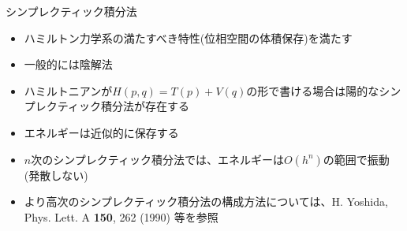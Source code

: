 \begin{frame}[t,fragile]{シンプレクティック積分法}
  \begin{itemize}
  \item ハミルトン力学系の満たすべき特性(位相空間の体積保存)を満たす
  \item 一般的には陰解法
  \item ハミルトニアンが$H(p,q) = T(p) + V(q)$の形で書ける場合は陽的なシンプレクティック積分法が存在する
  \item エネルギーは近似的に保存する
  \item $n$次のシンプレクティック積分法では、エネルギーは$O(h^n)$の範囲で振動(発散しない)
  \item より高次のシンプレクティック積分法の構成方法については、H. Yoshida, Phys. Lett. A {\bf 150}, 262 (1990) 等を参照
  \end{itemize}
\end{frame}

